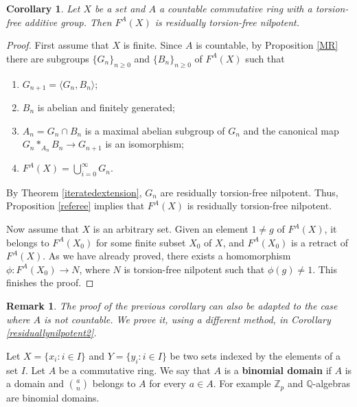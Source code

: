 \documentclass[11pt]{amsart}
\newtheorem{cor}[lem]{Corollary}
\newtheorem{rem}[lem]{Remark}
\numberwithin{claimcounter}{lem}
\newcommand{\Z}{\mathbb{Z}}
\newcommand{\Q}{\mathbb{Q}}
\begin{document}
   \begin{cor} \label{residuallynilpotent}
  Let $X$ be a   set and $A$ a countable commutative ring  with a torsion-free additive group. Then $F^{A}(X)$ is residually torsion-free nilpotent.
   \end{cor}
  \begin{proof} First assume that $X$ is finite.
Since $A$ is countable, by Proposition \ref{MR}   there are subgroups $\{G_n\}_{n\ge 0}$  and $\{B_n\}_{n\ge 0}$ of $F^{A}(X)$ such that 
 \begin{enumerate}
 \item[(a)] $G_{n+1}=\langle G_n, B_n\rangle$;
 \item[(b)] $B_n$ is abelian and finitely generated;

 \item[(c)]  $A_n=G_n\cap B_n$  is a maximal abelian subgroup of $G_n$ and the canonical map $G_n*_{A_n} B_n\to G_{n+1}$ is an isomorphism;
 \item[(d)]  $F^A(X)=\bigcup_{i=0}^\infty G_n$.
 \end{enumerate}
By Theorem \ref{iteratedextension}, $G_n$ are residually torsion-free nilpotent.  Thus, Proposition \ref{referee} implies that $F^{A}(X)$ is residually torsion-free nilpotent.

Now assume that $X$ is an arbitrary set.  Given an element $1\ne g$ of $F^A(X)$, it belongs to $F^A(X_0)$ for some finite subset $X_0$ of $X$, and $F^A(X_0)$ is a retract of $F^A(X)$. 
As we have already proved,  there exists a homomorphism $\phi:F^A(X_0)\to N$, where $N$ is  torsion-free nilpotent such that $\phi(g)\ne 1$. This finishes the proof.
  \end{proof}
  \begin{rem} The proof of the previous corollary can also be adapted to the case where $A$ is not countable. We prove it, using a different method, in
Corollary \ref{residuallynilpotent2}.
  \end{rem}
  Let  $X=\{x_i\colon i\in I\}$ and  $Y=\{y_i\colon i\in I\}$ be two sets indexed by the elements of a set $I$. Let  
$A$ be a commutative ring. We say that $A$ is a {\bf binomial domain} if $A$ is a domain and $a \choose n$ belongs to $A$ for every $a\in A$. 
For example $\Z_p$ and $\Q$-algebras are binomial domains.
\end{document}
